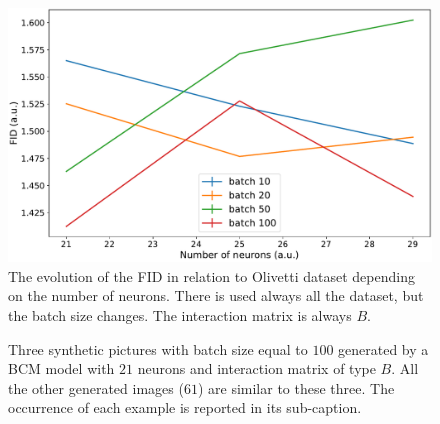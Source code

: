 \documentclass[a4paper,12pt]{article}
\begin{document}
\begin{figure}[!htb]
  \centering
  \includegraphics[width=.9\columnwidth]{all.pdf}
  \caption[FID changing batch's size]{The evolution of the FID in relation to Olivetti dataset depending on the number of neurons.
  There is used always all the dataset, but the batch size changes.
  The interaction matrix is always $B$.
  }
  \label{fig:all_g}
\end{figure}

\begin{figure}[!htb]
  \centering
  \caption[Pictures with batch $100$ and $N$ $21$]{Three synthetic pictures with batch size equal to $100$ generated by a BCM model with $21$ neurons and interaction matrix of type $B$.
  All the other generated images ($61$) are similar to these three.
  The occurrence of each example is reported in its sub-caption.
  }
  \label{fig:all_p}
\end{figure}
\end{document}
